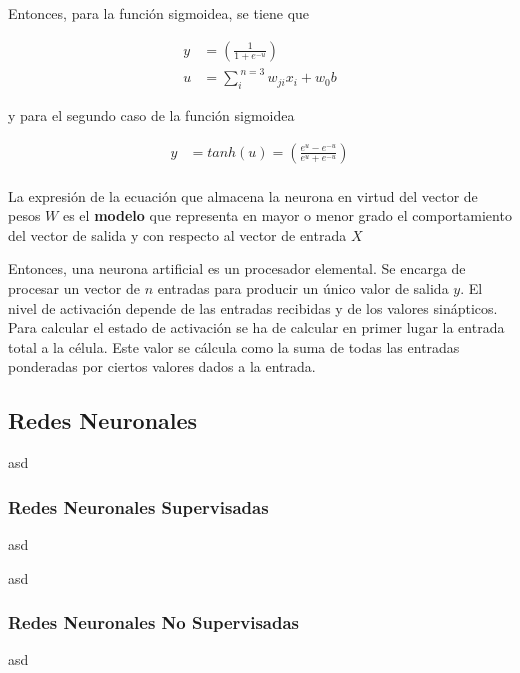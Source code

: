 \documentclass[12pt]{article}
\newcounter{subsubsubsection}[subsubsection]
\begin{document}
\begin{enumerate}
Entonces, para la función sigmoidea, se tiene que

\begin{equation} \label{eq3}
\begin{split}
y 	&= ( \frac{1}{1+e^{-u}}) \\
u	&= \sum_{i}^{\ n=3} w_{ji}x_i + w_0b
\end{split}
\end{equation}

y para el segundo caso de la función sigmoidea

\begin{equation} \label{eq3}
\begin{split}
y 	&= tanh(u) = ( \frac{e^u - e^{-u}}{e^u + e^{-u}}) \\
\end{split}
\end{equation}

La expresión de la ecuación que almacena la neurona en virtud del vector de pesos $W$ es el \textbf{modelo} que representa en mayor o menor grado el comportamiento del vector de salida y con respecto al vector de entrada $X$

\end{enumerate}

Entonces, una neurona artificial es un procesador elemental. Se encarga de procesar un vector de $n$ entradas para producir un único valor de salida $y$. El nivel de activación depende de las entradas recibidas y de los valores sinápticos. Para calcular el estado de activación se ha de calcular en primer lugar la entrada total a la célula. Este valor se cálcula como la suma de todas las entradas ponderadas por ciertos valores dados a la entrada.

\clearpage

\subsection{Redes Neuronales}
asd

\subsubsection{Redes Neuronales Supervisadas}
asd

asd
\subsubsection{Redes Neuronales No Supervisadas}
asd
\end{document}
